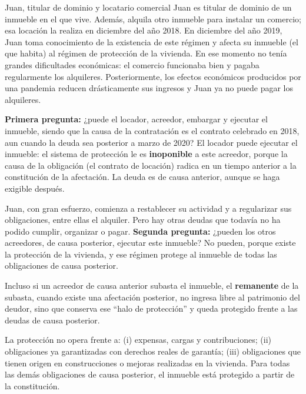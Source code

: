 \documentclass[12pt,oneside]{book}
\begin{document}
\begin{example}{Juan, titular de dominio y locatario comercial}
Juan es titular de dominio de un inmueble en el que vive. Además, alquila otro inmueble para instalar un comercio; esa locación la realiza en diciembre del año 2018. En diciembre del año 2019, Juan toma conocimiento de la existencia de este régimen y afecta su inmueble (el que habita) al régimen de protección de la vivienda. En ese momento no tenía grandes dificultades económicas: el comercio funcionaba bien y pagaba regularmente los alquileres. Posteriormente, los efectos económicos producidos por una pandemia reducen drásticamente sus ingresos y Juan ya no puede pagar los alquileres.

\textbf{Primera pregunta:} ¿puede el locador, acreedor, embargar y ejecutar el inmueble, siendo que la causa de la contratación es el contrato celebrado en 2018, aun cuando la deuda sea posterior a marzo de 2020? El locador puede ejecutar el inmueble: el sistema de protección le es \textbf{inoponible} a este acreedor, porque la causa de la obligación (el contrato de locación) radica en un tiempo anterior a la constitución de la afectación. La deuda es de causa anterior, aunque se haga exigible después.

Juan, con gran esfuerzo, comienza a restablecer su actividad y a regularizar sus obligaciones, entre ellas el alquiler. Pero hay otras deudas que todavía no ha podido cumplir, organizar o pagar. \textbf{Segunda pregunta:} ¿pueden los otros acreedores, de causa posterior, ejecutar este inmueble? No pueden, porque existe la protección de la vivienda, y ese régimen protege al inmueble de todas las obligaciones de causa posterior.
\end{example}

\begin{important}
Incluso si un acreedor de causa anterior subasta el inmueble, el \textbf{remanente} de la subasta, cuando existe una afectación posterior, no ingresa libre al patrimonio del deudor, sino que conserva ese ``halo de protección'' y queda protegido frente a las deudas de causa posterior.
\end{important}

La protección no opera frente a: (i) expensas, cargas y contribuciones; (ii) obligaciones ya garantizadas con derechos reales de garantía; (iii) obligaciones que tienen origen en construcciones o mejoras realizadas en la vivienda. Para todas las demás obligaciones de causa posterior, el inmueble está protegido a partir de la constitución.
\end{document}
